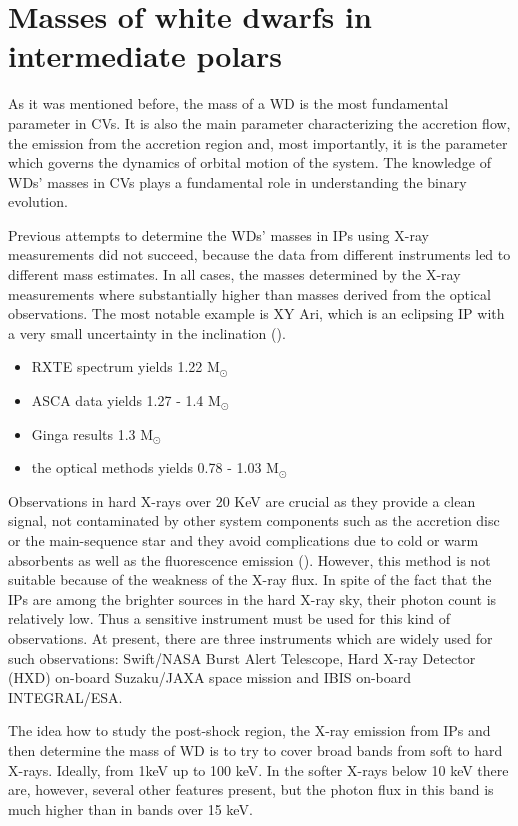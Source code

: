 \documentclass[oneside,a4paper,11pt]{report}
\begin{document}
\chapter{Masses of white dwarfs in intermediate polars}
As it was mentioned before, the mass of a WD is the most fundamental parameter in CVs. It is also the 
main parameter characterizing the accretion flow, the emission from the accretion region and, most 
importantly, it is the parameter which governs the dynamics of orbital motion of the system. The 
knowledge of WDs' masses in CVs plays a fundamental role in understanding the binary evolution. 

Previous attempts to determine the WDs' masses in IPs using X-ray measurements did not succeed, 
because the data from different instruments led to different mass estimates. In all cases, the 
masses  determined by the X-ray measurements where substantially higher than masses derived from  the optical 
observations. The most notable example is XY Ari, which is an eclipsing IP with a very small uncertainty in 
the inclination (\citet{1998MNRAS.297.1269R}).          
\begin{itemize}
 \item RXTE spectrum yields 1.22 M$_\odot$
 \item ASCA data yields 1.27 - 1.4 M$_\odot$
 \item Ginga results 1.3 M$_\odot$
 \item the optical methods yields 0.78 - 1.03 M$_\odot$ 
\end{itemize}
Observations in hard X-rays over 20 KeV are crucial as they provide a clean signal, not contaminated 
by other system components such as the accretion disc or the main-sequence star and they avoid 
complications due to cold or warm absorbents as well as the fluorescence emission (\citet{2009A&A...496..121B}). 
However, this method is not suitable because of the weakness of the X-ray flux. In spite of the fact that the IPs 
are among the brighter sources in the hard X-ray sky, their photon count is relatively low. Thus a sensitive 
instrument must be used for this kind of observations. At present, there are three instruments which are 
widely used for such observations: Swift/NASA Burst Alert Telescope, Hard X-ray Detector
(HXD) on-board Suzaku/JAXA space mission and IBIS on-board INTEGRAL/ESA.

The idea how to study the post-shock region, the X-ray emission from IPs and then 
determine the mass of WD is to try to cover broad bands from soft to hard X-rays. Ideally, 
from 1keV up to 100 keV. In the softer X-rays below 10 keV there are, however, several other features 
present, but the photon flux in this band is much higher than in bands over 15 keV. 
\end{document}
